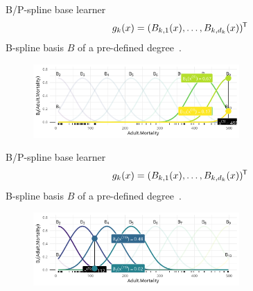 \begin{frame}{B/P-spline base learner}
  \vspace{-0.3cm}\[g_k(x) = (B_{k,1}(x), \dots, B_{k,d_k}(x))^{\mkern-1.5mu\mathsf{T}}\] B-spline basis $B$ of a pre-defined degree~\citep{eilers1996flexible}.
  \begin{center}
    \begin{figure}
      \includegraphics[width=0.7\textwidth]{figures/bs-base/fig-bs40.png}
    \end{figure}
  \end{center}
  \vspace{-0.3cm}
  
  \addtocounter{framenumber}{-1}
\end{frame}


\begin{frame}{B/P-spline base learner}
  \vspace{-0.3cm}\[g_k(x) = (B_{k,1}(x), \dots, B_{k,d_k}(x))^{\mkern-1.5mu\mathsf{T}}\] B-spline basis $B$ of a pre-defined degree~\citep{eilers1996flexible}.
  \begin{center}
    \begin{figure}
      \includegraphics[width=0.7\textwidth]{figures/bs-base/fig-bs70.png}
    \end{figure}
  \end{center}
  \vspace{-0.3cm}
  
  \addtocounter{framenumber}{-1}
\end{frame}


